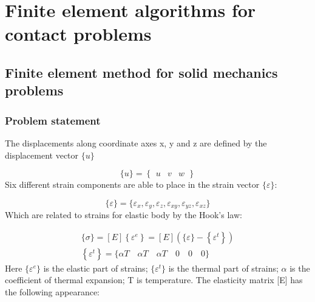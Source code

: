 
\chapter{ Finite element algorithms for contact problems} %

\label{Chapter3} %


\section{Finite element method for solid mechanics problems \parencite{ref2}\parencite{ref3}}
\subsection{Problem statement}
The displacements along coordinate axes x, y and z are defined by the displacement vector $\{u\}$ 

\begin{equation}
    \label{eqn:u}
    \{u\}=\left\{\begin{array}{lll}u & v & w \end{array}\right\} 
   \end{equation}
   Six different strain components are able to place in the strain vector $\{\varepsilon\}$:

\begin{equation}
    \{\varepsilon\}=\{\varepsilon_x,\varepsilon_y,\varepsilon_z,\varepsilon_{xy},\varepsilon_{yz},\varepsilon_{xz} \}
\end{equation}
Which are related to strains for elastic body by the Hook’s law:

\begin{equation}
    \begin{array}{l}
        \{ \sigma \}  = [E]\left\{ {{\varepsilon ^e}} \right\} = [E]\left( {\{ \varepsilon \}  - \left\{ {{\varepsilon ^t}} \right\}} \right)\\
        \left\{ {{\varepsilon ^t}} \right\} = \{ \alpha T\quad \alpha T\quad \alpha T\quad 0\quad 0\quad 0\} 
    \end{array}
   \end{equation}
Here $\{\varepsilon^e \}$ is the elastic part of strains; $\{\varepsilon^t\}$ is the thermal part of strains; $\alpha$ is the coefficient of thermal expansion; T is temperature. The elasticity matrix [E] has the following appearance:

